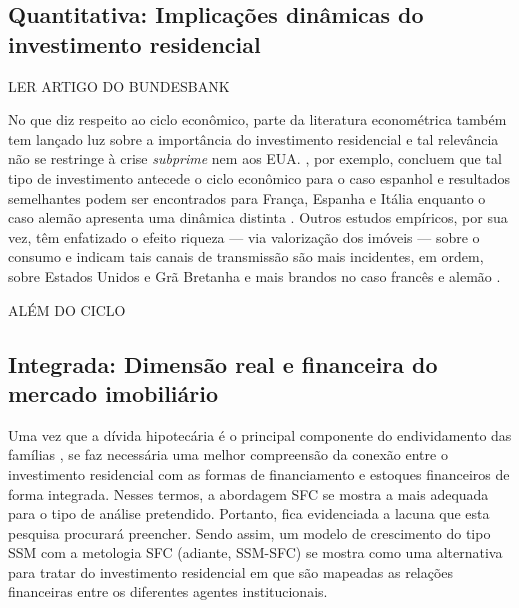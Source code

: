 



\subsection{Quantitativa: Implicações dinâmicas do investimento residencial}

LER ARTIGO DO BUNDESBANK


No que diz respeito ao ciclo econômico, parte da literatura econométrica também tem lançado luz sobre a importância do investimento residencial e tal relevância não se restringe à crise \textit{subprime} nem aos EUA. \textcite{alvarez_does_2010}, por exemplo, concluem que tal tipo de investimento antecede o ciclo econômico para o caso espanhol e resultados semelhantes podem ser encontrados para França, Espanha  e Itália enquanto o caso alemão apresenta uma dinâmica distinta \cites{ferrara_cyclical_2010}{ferrara_common_2010}. 
Outros estudos empíricos, por sua vez, têm enfatizado o efeito riqueza --- via valorização dos imóveis --- sobre o consumo e indicam tais canais de transmissão são mais incidentes, em ordem, sobre Estados Unidos e Grã Bretanha e mais brandos no caso francês e alemão \cites{sastre_assessment_2010}{chauvin_wealth_2010}{bassanetti_effects_2010}{arrondel_housing_2010}.

ALÉM DO CICLO

\subsection{Integrada: Dimensão real e financeira do mercado imobiliário}

Uma vez que a dívida hipotecária é o principal componente do endividamento das famílias \cite{van_gunten_varieties_2018}, se faz necessária uma melhor compreensão da conexão entre o investimento residencial com as formas de financiamento e estoques financeiros de forma integrada.
Nesses termos, a abordagem SFC se mostra a mais adequada para o tipo de análise pretendido. Portanto, fica evidenciada a lacuna que esta pesquisa procurará preencher.
Sendo assim, um modelo de crescimento do tipo SSM com a metologia SFC (adiante, SSM-SFC) se mostra como uma alternativa para tratar do investimento residencial em que são mapeadas as relações financeiras entre os diferentes agentes institucionais.



